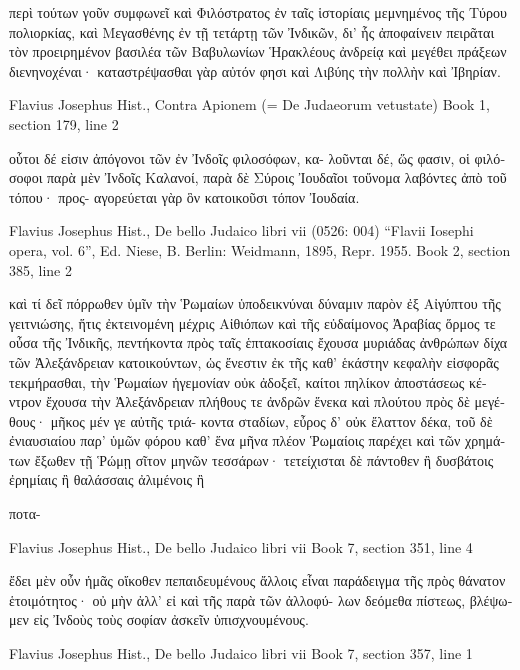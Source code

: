 \documentclass[12pt,letterpaper,twoside,final]{memoir}
\begin{document}
\begin{greek}
                                  περὶ τούτων γοῦν συμφωνεῖ καὶ 
Φιλόστρατος ἐν ταῖς ἱστορίαις μεμνημένος τῆς Τύρου πολιορκίας, 
καὶ Μεγασθένης ἐν τῇ τετάρτῃ τῶν Ἰνδικῶν, δι' ἧς ἀποφαίνειν 
πειρᾶται τὸν προειρημένον βασιλέα τῶν Βαβυλωνίων Ἡρακλέους 
ἀνδρείᾳ καὶ μεγέθει πράξεων διενηνοχέναι· καταστρέψασθαι γὰρ 
αὐτόν φησι καὶ Λιβύης τὴν πολλὴν καὶ Ἰβηρίαν. 



Flavius Josephus Hist., Contra Apionem (= De Judaeorum vetustate) 
Book 1, section 179, line 2

          οὗτοι δέ εἰσιν ἀπόγονοι τῶν ἐν Ἰνδοῖς φιλοσόφων, κα-
λοῦνται δέ, ὥς φασιν, οἱ φιλόσοφοι παρὰ μὲν Ἰνδοῖς Καλανοί, 
παρὰ δὲ Σύροις Ἰουδαῖοι τοὔνομα λαβόντες ἀπὸ τοῦ τόπου· προς-
αγορεύεται γὰρ ὃν κατοικοῦσι τόπον Ἰουδαία. 



Flavius Josephus Hist., De bello Judaico libri vii (0526: 004)
“Flavii Iosephi opera, vol. 6”, Ed. Niese, B.
Berlin: Weidmann, 1895, Repr. 1955.
Book 2, section 385, line 2

                                                 καὶ τί δεῖ πόρρωθεν 
ὑμῖν τὴν Ῥωμαίων ὑποδεικνύναι δύναμιν παρὸν ἐξ Αἰγύπτου τῆς 
γειτνιώσης, ἥτις ἐκτεινομένη μέχρις Αἰθιόπων καὶ τῆς εὐδαίμονος 
Ἀραβίας ὅρμος τε οὖσα τῆς Ἰνδικῆς, πεντήκοντα πρὸς ταῖς 
ἑπτακοσίαις ἔχουσα μυριάδας ἀνθρώπων δίχα τῶν Ἀλεξάνδρειαν 
κατοικούντων, ὡς ἔνεστιν ἐκ τῆς καθ' ἑκάστην κεφαλὴν εἰσφορᾶς 
τεκμήρασθαι, τὴν Ῥωμαίων ἡγεμονίαν οὐκ ἀδοξεῖ, καίτοι πηλίκον 
ἀποστάσεως κέντρον ἔχουσα τὴν Ἀλεξάνδρειαν πλήθους τε ἀνδρῶν 
ἕνεκα καὶ πλούτου πρὸς δὲ μεγέθους· μῆκος μέν γε αὐτῆς τριά-
κοντα σταδίων, εὖρος δ' οὐκ ἔλαττον δέκα, τοῦ δὲ ἐνιαυσιαίου 
παρ' ὑμῶν φόρου καθ' ἕνα μῆνα πλέον Ῥωμαίοις παρέχει καὶ τῶν 
χρημάτων ἔξωθεν τῇ Ῥώμῃ σῖτον μηνῶν τεσσάρων· τετείχισται δὲ 
πάντοθεν ἢ δυσβάτοις ἐρημίαις ἢ θαλάσσαις ἀλιμένοις ἢ

ποτα-



Flavius Josephus Hist., De bello Judaico libri vii 
Book 7, section 351, line 4

                                                         ἔδει μὲν οὖν 
ἡμᾶς οἴκοθεν πεπαιδευμένους ἄλλοις εἶναι παράδειγμα τῆς πρὸς 
θάνατον ἑτοιμότητος· οὐ μὴν ἀλλ' εἰ καὶ τῆς παρὰ τῶν ἀλλοφύ-
λων δεόμεθα πίστεως, βλέψωμεν εἰς Ἰνδοὺς τοὺς σοφίαν ἀσκεῖν 
ὑπισχνουμένους. 



Flavius Josephus Hist., De bello Judaico libri vii 
Book 7, section 357, line 1


\end{greek}
\end{document}

